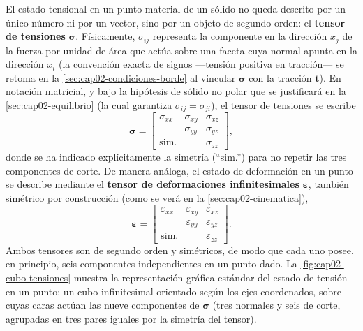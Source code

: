 El estado tensional en un punto material de un sólido no queda descrito por un único número ni por un vector, sino por un objeto de segundo orden: el \textbf{tensor de tensiones} $\bm\sigma$. Físicamente, $\sigma_{ij}$ representa la componente en la dirección $x_j$ de la fuerza por unidad de área que actúa sobre una faceta cuya normal apunta en la dirección $x_i$ (la convención exacta de signos —tensión positiva en tracción— se retoma en la \cref{sec:cap02-condiciones-borde} al vincular $\bm\sigma$ con la tracción $\bm t$). En notación matricial, y bajo la hipótesis de sólido no polar que se justificará en la \cref{sec:cap02-equilibrio} (la cual garantiza $\sigma_{ij}=\sigma_{ji}$), el tensor de tensiones se escribe
\[
\bm\sigma =
\begin{bmatrix}
\sigma_{xx} & \sigma_{xy} & \sigma_{xz} \\
& \sigma_{yy} & \sigma_{yz} \\
\text{sim.} & & \sigma_{zz}
\end{bmatrix},
\]
donde se ha indicado explícitamente la simetría (``sim.'') para no repetir las tres componentes de corte. De manera análoga, el estado de deformación en un punto se describe mediante el \textbf{tensor de deformaciones infinitesimales} $\bm\varepsilon$, también simétrico por construcción (como se verá en la \cref{sec:cap02-cinematica}),
\[
\bm\varepsilon =
\begin{bmatrix}
\varepsilon_{xx} & \varepsilon_{xy} & \varepsilon_{xz} \\
& \varepsilon_{yy} & \varepsilon_{yz} \\
\text{sim.} & & \varepsilon_{zz}
\end{bmatrix}.
\]
Ambos tensores son de segundo orden y simétricos, de modo que cada uno posee, en principio, seis componentes independientes en un punto dado. La \cref{fig:cap02-cubo-tensiones} muestra la representación gráfica estándar del estado de tensión en un punto: un cubo infinitesimal orientado según los ejes coordenados, sobre cuyas caras actúan las nueve componentes de $\bm\sigma$ (tres normales y seis de corte, agrupadas en tres pares iguales por la simetría del tensor).


